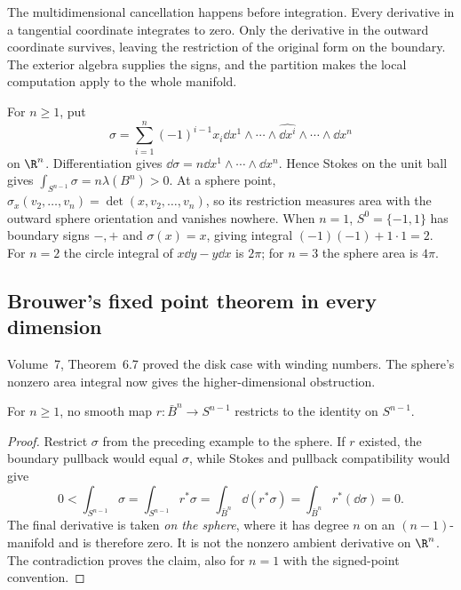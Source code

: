 \begin{beauty}
The multidimensional cancellation happens before integration. Every derivative in a tangential coordinate integrates to zero. Only the derivative in the outward coordinate survives, leaving the restriction of the original form on the boundary. The exterior algebra supplies the signs, and the partition makes the local computation apply to the whole manifold.
\end{beauty}

\begin{example}\label{ex:sigma}
For $n\ge1$, put
\[
\sigma=\sum_{i=1}^n(-1)^{i-1}x_i\dd x^1\wedge\cdots\wedge\widehat{\dd x^i}\wedge\cdots\wedge\dd x^n
\]
on $\R^n$. Differentiation gives $\dd\sigma=n\dd x^1\wedge\cdots\wedge\dd x^n$. Hence Stokes on the unit ball gives $\int_{S^{n-1}}\sigma=n\lambda(B^n)>0$. At a sphere point,
$\sigma_x(v_2,\ldots,v_n)=\det(x,v_2,\ldots,v_n)$, so its restriction measures area with the outward sphere orientation and vanishes nowhere. When $n=1$, $S^0=\{-1,1\}$ has boundary signs $-,+$ and $\sigma(x)=x$, giving integral $(-1)(-1)+1\cdot1=2$. For $n=2$ the circle integral of $x\dd y-y\dd x$ is $2\pi$; for $n=3$ the sphere area is $4\pi$.
\end{example}

\subsection*{Brouwer's fixed point theorem in every dimension}

Volume~7, Theorem~6.7 proved the disk case with winding numbers. The sphere's nonzero area integral now gives the higher-dimensional obstruction.

\begin{theorem}\label{thm:noretraction}
For $n\ge1$, no smooth map $r:\bar B^n\to S^{n-1}$ restricts to the identity on $S^{n-1}$.
\end{theorem}

\begin{proof}
Restrict $\sigma$ from the preceding example to the sphere. If $r$ existed, the boundary pullback would equal $\sigma$, while Stokes and pullback compatibility would give
\[
0<\int_{S^{n-1}}\sigma
=\int_{S^{n-1}}r^*\sigma
=\int_{\bar B^n}\dd(r^*\sigma)
=\int_{\bar B^n}r^*(\dd\sigma)=0.
\]
The final derivative is taken \emph{on the sphere}, where it has degree $n$ on an $(n-1)$-manifold and is therefore zero. It is not the nonzero ambient derivative on $\R^n$. The contradiction proves the claim, also for $n=1$ with the signed-point convention.
\end{proof}

